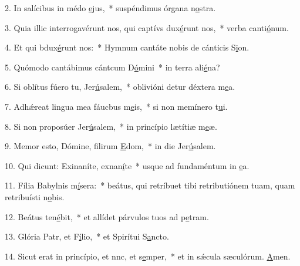 2. In salícibus in médo \uline{e}jus,~* suspéndimus órgana n\uline{o}stra.\par 
3. Quia illic interrogavérunt nos, qui captívs dux\uline{é}runt nos,~* verba canti\uline{ó}num.\par 
4. Et qui bdux\uline{é}runt nos:~* Hymnum cantáte nobis de cánticis S\uline{i}on.\par 
5. Quómodo cantábimus cántcum D\uline{ó}mini~* in terra ali\uline{é}na?\par 
6. Si oblítus fúero tu, Jer\uline{ú}salem,~* oblivióni detur déxtera m\uline{e}a.\par 
7. Adhǽreat lingua mea fáucbus m\uline{e}is,~* si non memínero t\uline{u}i.\par 
8. Si non proposúer Jer\uline{ú}salem,~* in princípio lætítiæ m\uline{e}æ.\par 
9. Memor esto, Dómine, filirum \uline{E}dom,~* in die Jer\uline{ú}salem.\par 
10. Qui dicunt: Exinaníte, exnan\uline{í}te~* usque ad fundaméntum in \uline{e}a.\par 
11. Fília Babylnis m\uline{í}sera:~* beátus, qui retríbuet tibi retributiónem tuam, quam retribuísti n\uline{o}bis.\par 
12. Beátus  ten\uline{é}bit,~* et allídet párvulos tuos ad p\uline{e}tram.\par 
13. Glória Patr, et F\uline{í}lio,~* et Spirítui S\uline{a}ncto.\par 
14. Sicut erat in princípio, et nnc, et s\uline{e}mper,~* et in sǽcula sæculórum. \uline{A}men.\par 
